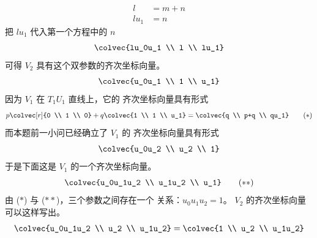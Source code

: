 \begin{exercises}
\begin{answer}
\begin{exparts}
\begin{equation*}
\begin{aligned}
               l    &= m+n    \\
               lu_1 &= n
             \end{aligned}
            \end{equation*}
           把 $lu_1$ 代入第一个方程中的 $n$
           \begin{equation*}
             \colvec{lu_0u_1 \\ l \\ lu_1}
           \end{equation*}
           可得
           $V_2$ 具有这个双参数的齐次坐标向量。
           \begin{equation*}
             \colvec{u_0u_1 \\ 1 \\ u_1}
           \end{equation*}
        \partsitem
           因为 $V_1$ 在 $T_1U_1$ 直线上，它的
           齐次坐标向量具有形式
           \begin{equation*}
             p\colvec[r]{0 \\ 1 \\ 0}+q\colvec{1 \\ 1 \\ u_1}
             =\colvec{q \\ p+q \\ qu_1}
           \tag*{($*$)}\end{equation*}
           而本题前一小问已经确立了 $V_1$ 的
           齐次坐标向量具有形式
           \begin{equation*}
            \colvec{u_0u_2 \\ u_2 \\ 1}             
           \end{equation*}
           于是下面这是 $V_1$ 的一个齐次坐标向量。
           \begin{equation*}
             \colvec{u_0u_1u_2 \\ u_1u_2 \\ u_1}             
           \tag*{($**$)}\end{equation*}
           由 ($*$) 与 ($**$)，三个参数之间存在一个
           关系：$u_0u_1u_2=1$。
         \partsitem  
           $V_2$ 的齐次坐标向量可以这样写出。
           \begin{equation*}
             \colvec{u_0u_1u_2 \\ u_2 \\ u_1u_2}
             =\colvec{1 \\ u_2 \\ u_1u_2}

\end{equation*}
\end{exparts}
\end{answer}
\end{exercises}
